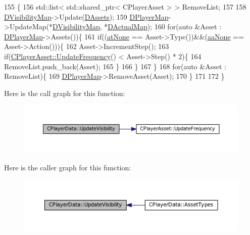 \begin{DoxyCode}
155                                   \{
156     std::list< std::shared\_ptr< CPlayerAsset > > RemoveList;
157     
158     \hyperlink{classCPlayerData_a804ea65e7ec7c90b2e335414d106cc78}{DVisibilityMap}->Update(\hyperlink{classCPlayerData_a1d7dd355facf52db6242e3554373906c}{DAssets});
159     \hyperlink{classCPlayerData_a452163191cd4603e1e38dd8d4bb9691c}{DPlayerMap}->UpdateMap(*\hyperlink{classCPlayerData_a804ea65e7ec7c90b2e335414d106cc78}{DVisibilityMap}, *\hyperlink{classCPlayerData_a943801106af1d7ad52abd73d32552186}{DActualMap});
160     \textcolor{keywordflow}{for}(\textcolor{keyword}{auto} &Asset : \hyperlink{classCPlayerData_a452163191cd4603e1e38dd8d4bb9691c}{DPlayerMap}->Assets())\{
161         \textcolor{keywordflow}{if}((\hyperlink{GameDataTypes_8h_a5600d4fc433b83300308921974477feca82fb51718e2c00981a2d37bc6fe92593}{atNone} == Asset->Type())&&(\hyperlink{GameDataTypes_8h_ab47668e651a3032cfb9c40ea2d60d670ac17cc5a0035320c060d7f8074143b507}{aaNone} == Asset->Action()))\{
162             Asset->IncrementStep();
163             \textcolor{keywordflow}{if}(\hyperlink{classCPlayerAsset_a0aff85b9552967a42f4f3f42cb59c19f}{CPlayerAsset::UpdateFrequency}() < Asset->Step() * 2)\{
164                 RemoveList.push\_back(Asset);   
165             \}
166         \}
167     \}
168     \textcolor{keywordflow}{for}(\textcolor{keyword}{auto} &Asset : RemoveList)\{
169         \hyperlink{classCPlayerData_a452163191cd4603e1e38dd8d4bb9691c}{DPlayerMap}->RemoveAsset(Asset);     
170     \}
171     
172 \}
\end{DoxyCode}
Here is the call graph for this function\+:\nopagebreak
\begin{figure}[H]
\begin{center}
\leavevmode
\includegraphics[width=350pt]{classCPlayerData_a3ac1393306e8a3f7c95d13ca01e429a7_cgraph}
\end{center}
\end{figure}
Here is the caller graph for this function\+:\nopagebreak
\begin{figure}[H]
\begin{center}
\leavevmode
\includegraphics[width=350pt]{classCPlayerData_a3ac1393306e8a3f7c95d13ca01e429a7_icgraph}
\end{center}
\end{figure}
\hypertarget{classCPlayerData_af263bd5a4864d98570d5a8a3f7986cdd}{}\label{classCPlayerData_af263bd5a4864d98570d5a8a3f7986cdd} 
